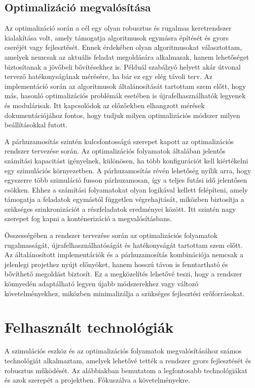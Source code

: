 \subsection{Optimalizáció megvalósítása}
Az optimalizáció során a cél egy olyan robusztus és rugalmas keretrendszer kialakítása volt, amely támogatja algoritmusok egymásra építését és gyors cseréjét vagy fejlesztését. Ennek érdekében olyan algoritmusokat választottam, amelyek nemcsak az aktuális feladat megoldására alkalmasak, hanem lehetőséget biztosítanak a jövőbeli bővítésekhez is. Példuál szabálzyó helyett akár útvonal tervező hatékonyságának mérésére, ha bár ez egy elég távoli terv. Az implementáció során az algoritmusok általánosítását tartottam szem előtt, hogy más, hasonló optimalizációs problémák esetében is újrafelhasználhatók legyenek és modulárisak. Itt kapcsolódok az előzőekben elhangzott mérések dokumentációjához fontos, hogy tudjuk milyen optimalizációs módszer milyen beállításokkal futott.

A párhuzamosítás szintén kulcsfontosságú szerepet kapott az optimalizációs rendszer tervezése során. Az optimalizációs folyamatok általában jelentős számítási kapacitást igényelnek, különösen, ha több konfigurációt kell kiértékelni egy szimulációs környezetben. A párhuzamosítás révén lehetőség nyílik arra, hogy egyszerre több szimuláció fusson párhuzamosan, így a teljes futási idő jelentősen csökken. Ehhez a számítási folyamatokat olyan logikával kellett felépíteni, amely támogatja a feladatok egymástól független végrehajtását, miközben biztosítja a szükséges szinkronizációt a részfeladatok eredményei között. Itt szintén nagy szerepet fog kapni a konténerizáció a megvalósításbans.

Összességében a rendszer tervezése során az optimalizációs folyamatok rugalmasságát, újrafelhasználhatóságát és hatékonyságát tartottam szem előtt. Az általánosított implementációk és a párhuzamosítás kombinációja nemcsak a jelenlegi projethez nyújt előnyöket, hanem hosszú távon is fenntartható és bővíthető megoldást biztosít. Ez a megközelítés lehetővé teszi, hogy a rendszer könnyedén adaptálható legyen újabb módszerekhez vagy változó követelményekhez, miközben minimalizálja a szükséges fejlesztési erőforrásokat.

\section{Felhasznált technológiák}
A szimulációs eszköz és az optimalizációs folyamatok megvalósításához számos technológiát alkalmaztam, amelyek lehetővé tették a rendszer gyors fejlesztését és robusztus működését. Az alábbiakban bemutatom a legfontosabb technológiákat és azok szerepét a projektben. Fókuszálva a követelményekre.

